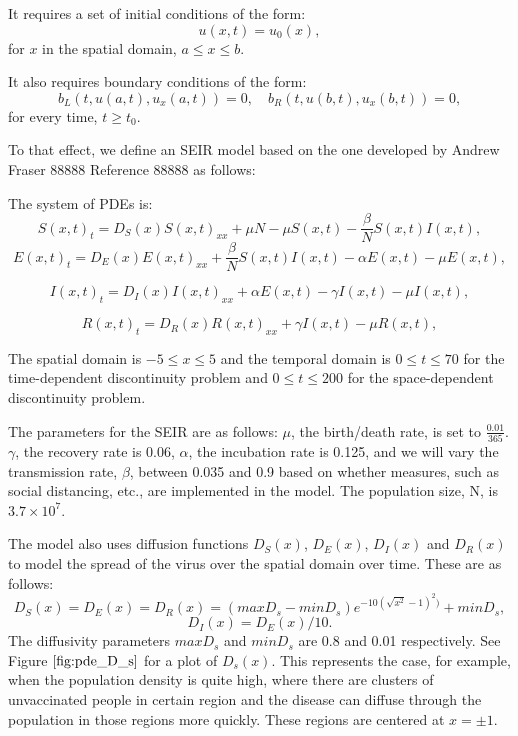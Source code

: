 \documentclass{article}
\begin{document}
It requires a set of initial conditions of the form:
\begin{equation}
u(x, t) = u_0(x),
\end{equation}
for $x$ in the spatial domain, ${a \leq x \leq b}$.

It also requires boundary conditions of the form:
\begin{equation}
b_L(t, u(a,t), u_x(a,t)) = 0, \quad b_R(t, u(b,t), u_x(b,t)) = 0,
\end{equation} 
for every time, $t \geq t_0$.

To that effect, we define an SEIR model based on the one developed by Andrew Fraser 88888 Reference 88888 as follows:

The system of PDEs is:
\begin{equation}
S(x, t)_t = D_S(x)S(x, t)_{xx} + \mu N - \mu S(x, t) - \frac{\beta}{N}S(x, t)I(x, t),
\end{equation}
\begin{equation}
E(x, t)_t = D_E(x)E(x, t)_{xx} + \frac{\beta}{N}S(x, t)I(x, t) - \alpha E(x, t) - \mu E(x, t),
\end{equation}

\begin{equation}
I(x, t)_t = D_I(x)I(x, t)_{xx} + \alpha E(x, t) - \gamma I(x, t) - \mu I(x, t),
\end{equation}

\begin{equation}
R(x, t)_t = D_R(x)R(x, t)_{xx} + \gamma I(x, t) - \mu R(x, t),
\end{equation} 

The spatial domain is $-5 \leq x \leq 5$ and the temporal domain is $0 \leq t \leq 70$ for the time-dependent discontinuity problem and $0 \leq t \leq 200$ for the space-dependent discontinuity problem.

The parameters for the SEIR are as follows: $\mu$, the birth/death rate, is set to $\frac{0.01}{365}$. $\gamma$, the recovery rate is 0.06, $\alpha$, the incubation rate is 0.125, and we will vary the transmission rate, $\beta$, between 0.035 and 0.9 based on whether measures, such as social distancing, etc., are implemented in the model. The population size, N, is $3.7 \times 10^{7}$.

The model also uses diffusion functions $D_S(x)$, $D_E(x)$, $D_I(x)$ and $D_R(x)$ to model the spread of the virus over the spatial domain over time. These are as follows:
\begin{equation}
D_S(x) = D_E(x) = D_R(x) = (maxD_s - minD_s)e^{-10(\sqrt{x^{2}} - 1)^2)} + minD_s,
\end{equation} 
\begin{equation}
D_I(x) = D_E(x)/10.
\end{equation}
The diffusivity parameters $maxD_s$ and $minD_s$ are 0.8 and 0.01 respectively. See Figure $\ref{fig:pde_D_s}$ for a plot of $D_s(x)$. This represents the case, for example, when the population density is quite high, where there are clusters of unvaccinated people in certain region and the disease can diffuse through the population in those regions more quickly. These regions are centered at $x= \pm 1$.
\end{document}
